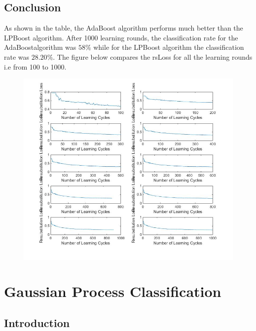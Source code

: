 \documentclass[12pt]{article}
\begin{document}
\subsection{Conclusion}

As shown in the table, the AdaBoost algorithm  performs much better than the LPBoost algorithm. After 1000 learning rounds, the classification rate for the AdaBoostalgorithm was $58\%$ while for the LPBoost algorithm the classification rate was $28.20\%$. The figure below  compares the rsLoss for all the learning rounds i.e from 100 to 1000.


\begin{figure}[!t]
\centering
\includegraphics[width=6.5in]{boosting}
\end{figure}

  \newpage
 
\section{Gaussian Process Classification}

\subsection{Introduction}
\end{document}
